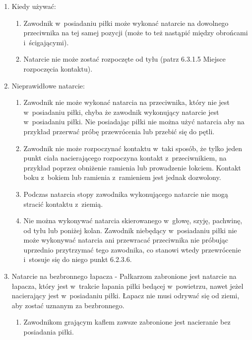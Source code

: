 \documentclass[12pt,a4paper]{article}
\begin{document}
\begin{enumerate}
	\item
	      Kiedy używać:

	      \begin{enumerate}
		      \item
		            Zawodnik w~posiadaniu piłki może wykonać natarcie na dowolnego
		            przeciwnika na tej samej pozycji (może to też nastąpić między
		            obrońcami i~ścigającymi).
		      \item
		            Natarcie nie może zostać rozpoczęte od tyłu (patrz 6.3.1.5 Miejsce
		            rozpoczęcia kontaktu).
	      \end{enumerate}
	\item
	      Nieprawidłowe natarcie:

	      \begin{enumerate}
		      \item
		            Zawodnik nie może wykonać natarcia na przeciwnika, który nie jest w~posiadaniu piłki, chyba że zawodnik wykonujący natarcie jest w~posiadaniu piłki. Nie posiadając piłki nie można użyć natarcia aby na przykład przerwać próbę przewrócenia lub przebić się do pętli.
		      \item
		            Zawodnik nie może rozpoczynać kontaktu w~taki sposób, że tylko jeden
		            punkt ciała nacierającego rozpoczyna kontakt z~przeciwnikiem, na
		            przykład poprzez obniżenie ramienia lub prowadzenie łokciem. Kontakt
		            boku z~bokiem lub ramienia z~ramieniem jest jednak dozwolony.
		      \item
		            Podczas natarcia stopy zawodnika wykonującego natarcie nie mogą
		            stracić kontaktu z~ziemią.
		      \item
		            Nie można wykonywać natarcia skierowanego w~głowę, szyję, pachwinę,
		            od tyłu lub poniżej kolan. Zawodnik niebędący w~posiadaniu piłki nie
		            może wykonywać natarcia ani przewracać przeciwnika nie próbując
		            uprzednio przytrzymać tego zawodnika, co stanowi wtedy przewrócenie
		            i~stosuje się do niego punkt 6.2.3.6.
	      \end{enumerate}
	\item
	      Natarcie na bezbronnego łapacza - Pałkarzom zabronione jest natarcie na
	      łapacza, który jest w~trakcie łapania piłki bedącej w~powietrzu, nawet
	      jeżel nacierający jest w~posiadaniu piłki. Łapacz nie musi odrywać się
	      od ziemi, aby zostać uznanym za bezbronnego.

	      \begin{enumerate}
		      \item
		            Zawodnikom grającym kaflem zawsze zabronione jest nacieranie bez
		            posiadania piłki.
	      \end{enumerate}
\end{enumerate}
\end{document}
